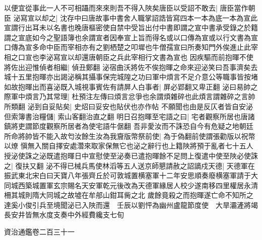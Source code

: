 以便宜從事此一人不可相躡而來來則吾不得入陜矣唐臣以受詔不敢去|{
	唐臣當作朝臣}
泌寫宣以却之|{
	沈存中曰唐故事中書舍人職掌詔誥皆寫四本一本為底一本為宣此宣謂行出耳未以名書也晚唐樞密使自禁中受旨出付中書即謂之宣中書承受錄之於籍謂之宣底如今之聖語簿也余謂宣者因奉宣上旨而得名或以口傳為宣或以行文書為宣口傳為宣多命中臣而宰相亦有之劉栖楚之叩墀也牛僧孺宣曰所奏知門外俟進止此宰相之口宣也李泌寫宣以却還唐朝臣之兵此宰相行文書為宣也}
因疾驅而前抱暉不使將佐出迎惟偵者相繼|{
	偵丑鄭翻}
泌宿曲沃將佐不俟抱暉之命來迎泌笑曰吾事濟矣去城十五里抱暉亦出謁泌稱其攝事保完城隍之功曰軍中煩言不足介意公等職事皆按堵如故抱暉出而喜泌既入城視事賓佐有請屏人白事者|{
	屏必郢翻又卑正翻}
泌曰易帥之際軍中煩言乃其常理|{
	杜預注左傳曰煩言忿爭也余謂煩雜碎也此煩言謂雜碎之言帥所類翻}
泌到自妥貼矣|{
	史炤曰妥安也貼伏也亦作帖}
不願聞也由是反仄者皆自安泌但索簿書治糧儲|{
	索山客翻治直之翻}
明日召抱暉至宅語之曰|{
	宅者觀察所居也唐諸鎮將吏謂節度觀察所居者為使宅語牛倨翻}
吾非愛汝而不誅恐自今有危疑之地朝廷所命將帥皆不能入故匄汝餘生汝為我齎版幣祭前使|{
	為于偽翻前使謂張勸版以祝幣以燎}
愼無入關自擇安處濳來取家保無它也泌之辭行也上籍陜將預于亂者七十五人授泌使誅之泌既遣抱暉日中宣慰使至泌奏已遣抱暉餘不足問上復遣中使至陜必使誅之|{
	復扶又翻}
泌不得已械兵馬使林滔等五人送京師懇請赦之詔謫戍天德|{
	天德軍在振武東北宋白曰天寶八年張齊丘於可敦城置横塞軍十二年安思順奏廢横塞軍請于大同城西築城置軍玄宗賜名天安軍乾元後改為天德軍緣居人校少遂南移四里權居永清柵其城則隋大同城之故墟在牟郍山鉗耳胔之北}
歲餘竟殺之而抱暉遂亡命不知所之達奚小俊引兵至境聞泌已入陜而還　壬辰以劉怦為幽州盧龍節度使　大旱灞滻將竭長安井皆無水度支奏中外經費纔支七旬

資治通鑑卷二百三十一
